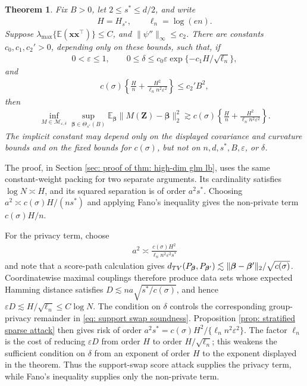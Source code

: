 \documentclass[letterpaper,12pt]{article}
\numberwithin{equation}{section}
\theoremstyle{plain}
\newtheorem{Theorem}{Theorem}
\numberwithin{Theorem}{section}
\numberwithin{proposition}{section}
\numberwithin{Lemma}{section}
{
	\theoremstyle{definition}
	\newtheorem{Definition}{Definition}
	\newtheorem{example}{Example}
	\numberwithin{example}{section}
	\newtheorem{fact}{Fact}
	\numberwithin{fact}{section}
	\newtheorem{remark}{Remark}
}
\newcommand{\furtherrev}[1]{#1}
\newcommand{\1}{\mathbbm{1}}
\def\bbeta{{\boldsymbol{\beta}}}
\def\E{\mathbb{E}}
\begin{document}
\begin{Theorem}\label{thm: high-dim glm lb}
	Fix $B>0$, let $2\leq s^*\leq d/2$, and write
	\begin{align*}
		H=H_{s^*},\qquad \ell_n=\log(en).
	\end{align*}
	Suppose
	$\lambda_{\max}\{\E(\bm x\bm x^\top)\}\leq C$, and
	$\|\psi''\|_\infty\leq c_2$.  There are constants $c_0,c_1,c_2'>0$, depending only on these bounds, such that, if
	\begin{align*}
		0<\varepsilon\leq1,\qquad
		0\leq\delta\leq c_0\varepsilon
		\exp\{-c_1H/\sqrt{\ell_n}\},
	\end{align*}
	and
	\begin{align*}
		c(\sigma)\left\{\frac{H}{n}
		+\frac{H^2}{\ell_n n^2\varepsilon^2}\right\}
		\leq c_2'B^2,
	\end{align*}
	then
	\begin{align}
		\inf_{M\in\mathcal M_{\varepsilon,\delta}}
		\sup_{\bbeta\in\Theta_{s^*}(B)}
		\E_{\bbeta}\|M(\bm Z)-\bbeta\|_2^2
		\gtrsim c(\sigma)\left\{
		\frac{H}{n}
		+\frac{H^2}{\ell_n n^2\varepsilon^2}
		\right\}.                                             \label{eq: high-dim glm lb}
	\end{align}
	\furtherrev{The implicit constant may depend only on the displayed covariance and curvature bounds and on the fixed bounds for $c(\sigma)$, but not on $n,d,s^*,B,\varepsilon$, or $\delta$.}
\end{Theorem}

The proof, in Section \ref{sec: proof of thm: high-dim glm lb}, uses the same constant-weight packing for two separate arguments.  Its cardinality satisfies $\log N\asymp H$, and its squared separation is of order $a^2s^*$.  Choosing $a^2\asymp c(\sigma)H/(ns^*)$ and applying Fano's inequality gives the non-private term $c(\sigma)H/n$.

For the privacy term, choose
\begin{align*}
	a^2\asymp\frac{c(\sigma)H^2}{\ell_n n^2\varepsilon^2s^*}
\end{align*}
and note that a score-path calculation gives
$d_{\rm TV}(P_{\bbeta},P_{\bbeta'})\lesssim
\|\bbeta-\bbeta'\|_2/\sqrt{c(\sigma)}$.  Coordinatewise maximal couplings therefore produce data sets whose expected Hamming distance satisfies
$D\lesssim na\sqrt{s^*/c(\sigma)}$, and hence
$\varepsilon D\lesssim H/\sqrt{\ell_n}\leq C\log N$.
The condition on $\delta$ controls the corresponding group-privacy remainder in \eqref{eq: support swap soundness}.  Proposition \ref{prop: stratified sparse attack} then gives risk of order $a^2s^*=c(\sigma)H^2/\{\ell_n n^2\varepsilon^2\}$.  The factor $\ell_n$ is the cost of reducing $\varepsilon D$ from order $H$ to order $H/\sqrt{\ell_n}$; this weakens the sufficient condition on $\delta$ from an exponent of order $H$ to the exponent displayed in the theorem.  Thus the support-swap score attack supplies the privacy term, while Fano's inequality supplies only the non-private term.
\end{document}
